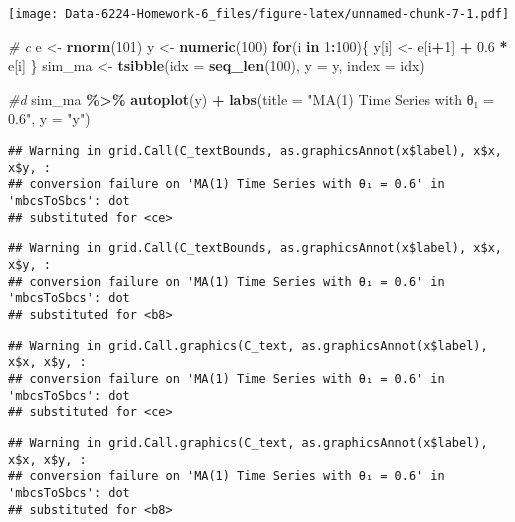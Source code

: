 \documentclass[
]{article}
\newenvironment{Shaded}{\begin{snugshade}}{\end{snugshade}}
\newcommand{\AttributeTok}[1]{\textcolor[rgb]{0.13,0.29,0.53}{#1}}
\newcommand{\CommentTok}[1]{\textcolor[rgb]{0.56,0.35,0.01}{\textit{#1}}}
\newcommand{\ControlFlowTok}[1]{\textcolor[rgb]{0.13,0.29,0.53}{\textbf{#1}}}
\newcommand{\DecValTok}[1]{\textcolor[rgb]{0.00,0.00,0.81}{#1}}
\newcommand{\FloatTok}[1]{\textcolor[rgb]{0.00,0.00,0.81}{#1}}
\newcommand{\FunctionTok}[1]{\textcolor[rgb]{0.13,0.29,0.53}{\textbf{#1}}}
\newcommand{\NormalTok}[1]{#1}
\newcommand{\OtherTok}[1]{\textcolor[rgb]{0.56,0.35,0.01}{#1}}
\newcommand{\SpecialCharTok}[1]{\textcolor[rgb]{0.81,0.36,0.00}{\textbf{#1}}}
\newcommand{\StringTok}[1]{\textcolor[rgb]{0.31,0.60,0.02}{#1}}
\begin{document}
\texttt{[image: Data-6224-Homework-6\_files/figure-latex/unnamed-chunk-7-1.pdf]}

\begin{Shaded}
\begin{Highlighting}[]
\CommentTok{\# c }
\NormalTok{e }\OtherTok{\textless{}{-}} \FunctionTok{rnorm}\NormalTok{(}\DecValTok{101}\NormalTok{)}
\NormalTok{y }\OtherTok{\textless{}{-}} \FunctionTok{numeric}\NormalTok{(}\DecValTok{100}\NormalTok{)}
\ControlFlowTok{for}\NormalTok{(i }\ControlFlowTok{in} \DecValTok{1}\SpecialCharTok{:}\DecValTok{100}\NormalTok{)\{}
\NormalTok{  y[i] }\OtherTok{\textless{}{-}}\NormalTok{ e[i}\SpecialCharTok{+}\DecValTok{1}\NormalTok{] }\SpecialCharTok{+} \FloatTok{0.6} \SpecialCharTok{*}\NormalTok{ e[i]}
\NormalTok{\}}
\NormalTok{sim\_ma }\OtherTok{\textless{}{-}} \FunctionTok{tsibble}\NormalTok{(}\AttributeTok{idx =} \FunctionTok{seq\_len}\NormalTok{(}\DecValTok{100}\NormalTok{), }\AttributeTok{y =}\NormalTok{ y, }\AttributeTok{index =}\NormalTok{ idx)}

\CommentTok{\#d}
\NormalTok{sim\_ma }\SpecialCharTok{\%\textgreater{}\%}
  \FunctionTok{autoplot}\NormalTok{(y) }\SpecialCharTok{+}
  \FunctionTok{labs}\NormalTok{(}\AttributeTok{title =} \StringTok{"MA(1) Time Series with θ₁ = 0.6"}\NormalTok{, }\AttributeTok{y =} \StringTok{"y"}\NormalTok{)}
\end{Highlighting}
\end{Shaded}

\begin{verbatim}
## Warning in grid.Call(C_textBounds, as.graphicsAnnot(x$label), x$x, x$y, :
## conversion failure on 'MA(1) Time Series with θ₁ = 0.6' in 'mbcsToSbcs': dot
## substituted for <ce>
\end{verbatim}

\begin{verbatim}
## Warning in grid.Call(C_textBounds, as.graphicsAnnot(x$label), x$x, x$y, :
## conversion failure on 'MA(1) Time Series with θ₁ = 0.6' in 'mbcsToSbcs': dot
## substituted for <b8>
\end{verbatim}

\begin{verbatim}
## Warning in grid.Call.graphics(C_text, as.graphicsAnnot(x$label), x$x, x$y, :
## conversion failure on 'MA(1) Time Series with θ₁ = 0.6' in 'mbcsToSbcs': dot
## substituted for <ce>
\end{verbatim}

\begin{verbatim}
## Warning in grid.Call.graphics(C_text, as.graphicsAnnot(x$label), x$x, x$y, :
## conversion failure on 'MA(1) Time Series with θ₁ = 0.6' in 'mbcsToSbcs': dot
## substituted for <b8>
\end{verbatim}
\end{document}
